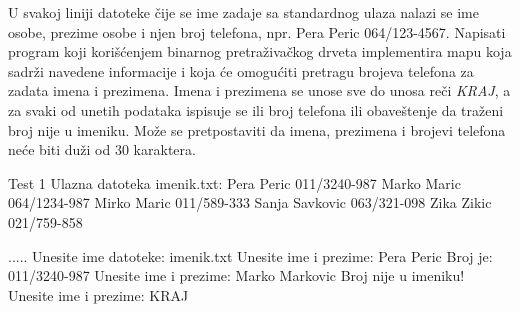 
\begin{Exercise}[label=704]
U svakoj liniji datoteke čije se ime zadaje sa standardnog ulaza nalazi se ime osobe, prezime osobe i njen broj telefona, npr. Pera Peric 064/123-4567. Napisati program koji korišćenjem binarnog pretraživačkog drveta implementira mapu koja sadrži navedene informacije i koja će omogućiti pretragu brojeva telefona za zadata imena i prezimena. Imena i prezimena se unose sve do unosa reči \textit{KRAJ}, a za svaki od unetih podataka ispisuje se ili broj telefona ili obaveštenje da traženi broj nije u imeniku. Može se pretpostaviti da imena, prezimena i brojevi telefona neće biti duži od 30 karaktera.  

\begin{maxitest}
\begin{test}{Test 1}
Ulazna datoteka imenik.txt:
Pera Peric 011/3240-987
Marko Maric 064/1234-987
Mirko Maric 011/589-333
Sanja Savkovic 063/321-098
Zika Zikic 021/759-858

.....
Unesite ime datoteke: imenik.txt
Unesite ime i prezime: Pera Peric
Broj je: 011/3240-987
Unesite ime i prezime: Marko Markovic
Broj nije u imeniku!
Unesite ime i prezime: KRAJ
\end{test}
\end{maxitest}

\end{Exercise}


